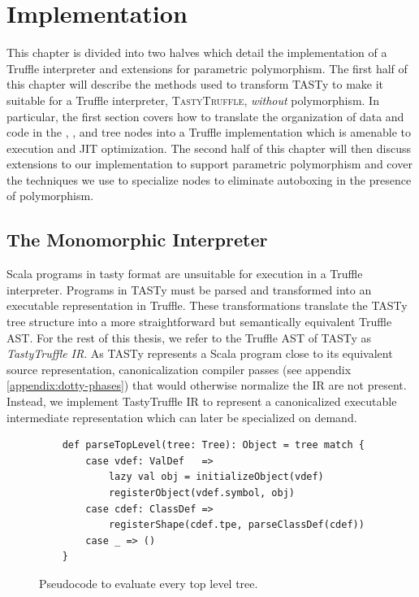 \chapter{Implementation}
\label{chapter:implementation}

This chapter is divided into two halves which detail the implementation of a Truffle interpreter and extensions for parametric polymorphism.
The first half of this chapter will describe the methods used to transform TASTy to make it suitable for a Truffle interpreter, \textsc{TastyTruffle}, \textit{without} polymorphism.
In particular, the first section covers how to translate the organization of data and code in the , , and  tree nodes into a Truffle implementation which is amenable to execution and JIT optimization.
The second half of this chapter will then discuss extensions to our implementation to support parametric polymorphism and cover the techniques we use to specialize nodes to eliminate autoboxing in the presence of polymorphism. 

\section{The Monomorphic Interpreter}
\label{impl:section:monomorphic}

Scala programs in \acrshort{tasty} format are unsuitable for execution in a Truffle interpreter. 
Programs in TASTy must be parsed and transformed into an executable representation in Truffle.
These transformations translate the TASTy tree structure into a more straightforward but semantically equivalent Truffle AST.
For the rest of this thesis, we refer to the Truffle AST of TASTy as \textit{TastyTruffle IR}.
As TASTy represents a Scala program close to its equivalent source representation, canonicalization compiler passes (see appendix \ref{appendix:dotty-phases}) that would otherwise normalize the IR are not present. 
Instead, we implement TastyTruffle IR to represent a canonicalized executable intermediate representation which can later be specialized on demand. 

\begin{figure}[!htb]
	\begin{verbatim}
	def parseTopLevel(tree: Tree): Object = tree match {
		case vdef: ValDef   => 
			lazy val obj = initializeObject(vdef)
			registerObject(vdef.symbol, obj)			
		case cdef: ClassDef => 
			registerShape(cdef.tpe, parseClassDef(cdef))	
		case _ => ()
	}
	\end{verbatim}
	\caption{Pseudocode to evaluate every top level tree.}
	\label{impl:top-level}
\end{figure}


